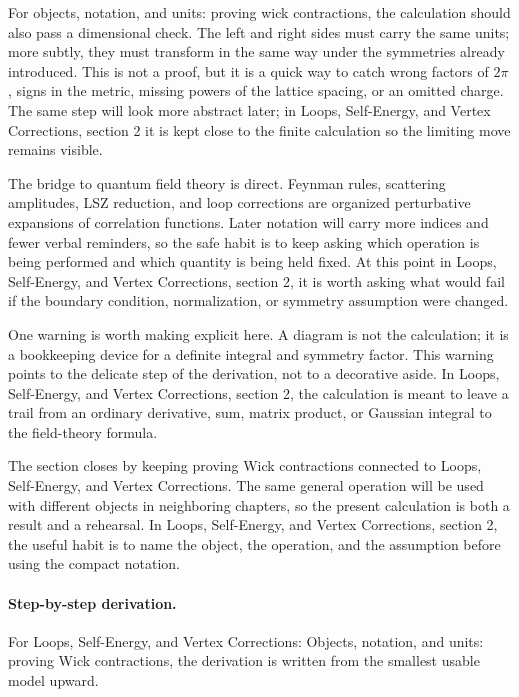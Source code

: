 For objects, notation, and units: proving wick contractions, the calculation should also pass a dimensional check.  The left and right sides must carry the same units; more subtly, they must transform in the same way under the symmetries already introduced.  This is not a proof, but it is a quick way to catch wrong factors of \(2\pi\), signs in the metric, missing powers of the lattice spacing, or an omitted charge.  The same step will look more abstract later; in Loops, Self-Energy, and Vertex Corrections, section 2 it is kept close to the finite calculation so the limiting move remains visible.

The bridge to quantum field theory is direct.  Feynman rules, scattering amplitudes, LSZ reduction, and loop corrections are organized perturbative expansions of correlation functions.  Later notation will carry more indices and fewer verbal reminders, so the safe habit is to keep asking which operation is being performed and which quantity is being held fixed.  At this point in Loops, Self-Energy, and Vertex Corrections, section 2, it is worth asking what would fail if the boundary condition, normalization, or symmetry assumption were changed.

One warning is worth making explicit here.  A diagram is not the calculation; it is a bookkeeping device for a definite integral and symmetry factor.  This warning points to the delicate step of the derivation, not to a decorative aside.  In Loops, Self-Energy, and Vertex Corrections, section 2, the calculation is meant to leave a trail from an ordinary derivative, sum, matrix product, or Gaussian integral to the field-theory formula.

The section closes by keeping proving Wick contractions connected to Loops, Self-Energy, and Vertex Corrections.  The same general operation will be used with different objects in neighboring chapters, so the present calculation is both a result and a rehearsal.  In Loops, Self-Energy, and Vertex Corrections, section 2, the useful habit is to name the object, the operation, and the assumption before using the compact notation.



\paragraph{Step-by-step derivation.}

For Loops, Self-Energy, and Vertex Corrections: Objects, notation, and units: proving Wick contractions, the derivation is written from the smallest usable model upward.

